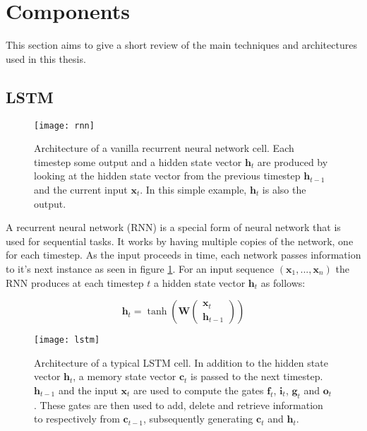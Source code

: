 \section{Components}

This section aims to give a short review of the main techniques and architectures used in this thesis.

\subsection{LSTM}

\begin{figure}[p]
\centering
\texttt{[image: rnn]}
\caption{Architecture of a vanilla recurrent neural network cell. Each timestep some output and a hidden state vector \(\mathbf{h}_t\) are produced by looking at the hidden state vector from the previous timestep \(\mathbf{h}_{t-1}\) and the current input \(\mathbf{x}_t\). In this simple example, \(\mathbf{h}_t\) is also the output.}
\label{rnn}
\end{figure}

A recurrent neural network (RNN)\cite{rnn} is a special form of neural network that is used for sequential tasks. It works by having multiple copies of the network, one for each timestep. As the input proceeds in time, each network passes information to it's next instance as seen in figure \ref{rnn}. For an input sequence \((\mathbf{x}_1, ..., \mathbf{x}_n)\) the RNN produces at each timestep \(t\) a hidden state vector \(\mathbf{h}_t\) as follows:

\begin{equation*}
  \mathbf{h}_t = \tanh \left(\mathbf{W} \begin{pmatrix} \mathbf{x}_t \\ \mathbf{h}_{t-1} \end{pmatrix} \right)
\end{equation*}

\begin{figure}[p]
\centering
\texttt{[image: lstm]}
\caption{Architecture of a typical LSTM cell. In addition to the hidden state vector \(\mathbf{h}_t\), a memory state vector \(\mathbf{c}_t\) is passed to the next timestep. \(\mathbf{h}_{t-1}\) and the input \(\mathbf{x}_t\) are used to compute the gates \(\mathbf{f}_t\), \(\mathbf{i}_t\), \(\mathbf{g}_t\) and \(\mathbf{o}_t\). These gates are then used to add, delete and retrieve information to respectively from \(\mathbf{c}_{t-1}\), subsequently generating \(\mathbf{c}_t\) and \(\mathbf{h}_t\).}
\label{lstm}
\end{figure}

